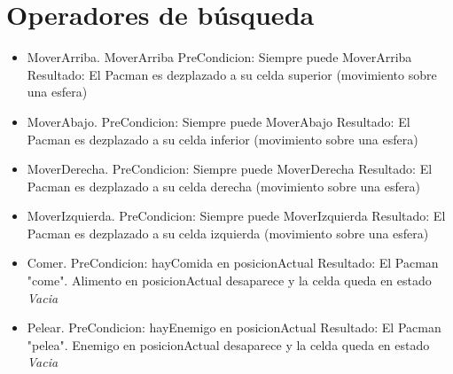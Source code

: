 \section{Operadores de búsqueda}
\begin{itemize}
\item MoverArriba.
MoverArriba
PreCondicion: Siempre puede MoverArriba
Resultado: El Pacman es dezplazado a su celda superior (movimiento sobre una esfera)
\item MoverAbajo.
PreCondicion: Siempre puede MoverAbajo
Resultado: El Pacman es dezplazado a su celda inferior (movimiento sobre una esfera)
\item MoverDerecha.
PreCondicion: Siempre puede MoverDerecha
Resultado: El Pacman es dezplazado a su celda derecha (movimiento sobre una esfera)
\item MoverIzquierda.
PreCondicion: Siempre puede MoverIzquierda
Resultado: El Pacman es dezplazado a su celda izquierda (movimiento sobre una esfera)
\item Comer.
PreCondicion: hayComida en posicionActual
Resultado: El Pacman "come". Alimento en posicionActual desaparece y la celda queda en estado \textit{Vacia}
\item Pelear.
PreCondicion: hayEnemigo en posicionActual
Resultado: El Pacman "pelea". Enemigo en posicionActual desaparece y la celda queda en estado \textit{Vacia}
\end{itemize}

